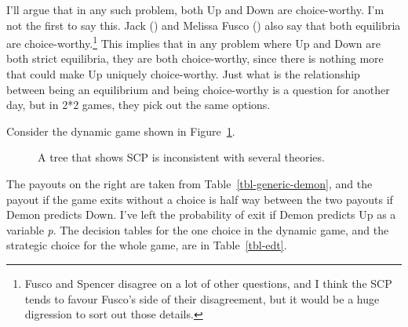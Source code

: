\documentclass[
  10pt,
  letterpaper,
  DIV=11,
  numbers=noendperiod,
  twoside]{scrartcl}
\begin{document}
I'll argue that in any such problem, both Up and Down are choice-worthy.
I'm not the first to say this. Jack
() and Melissa Fusco
() also say that both equilibria are
choice-worthy.\footnote{Fusco and Spencer disagree on a lot of other
  questions, and I think the SCP tends to favour Fusco's side of their
  disagreement, but it would be a huge digression to sort out those
  details.} This implies that in any problem where Up and Down are both
strict equilibria, they are both choice-worthy, since there is nothing
more that could make Up uniquely choice-worthy. Just what is the
relationship between being an equilibrium and being choice-worthy is a
question for another day, but in 2*2 games, they pick out the same
options.

Consider the dynamic game shown in Figure~\ref{fig-edt}.

\begin{figure}


\caption{\label{fig-edt}A tree that shows SCP is inconsistent with
several theories.}

\end{figure}%

The payouts on the right are taken from Table~\ref{tbl-generic-demon},
and the payout if the game exits without a choice is half way between
the two payouts if Demon predicts Down. I've left the probability of
exit if Demon predicts Up as a variable \emph{p}. The decision tables
for the one choice in the dynamic game, and the strategic choice for the
whole game, are in Table~\ref{tbl-edt}.
\end{document}
